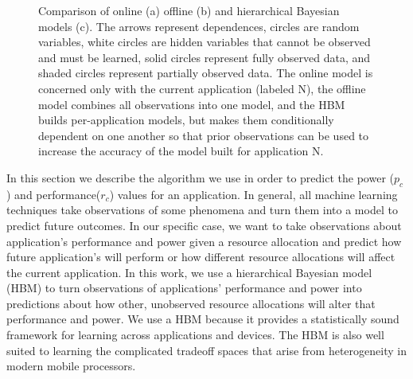 {\begin{figure}
  \caption{ Comparison of online (a) offline (b) and hierarchical
    Bayesian models (c).  The arrows represent dependences, circles
    are random variables, white circles are hidden variables that
    cannot be observed and must be learned, solid circles represent
    fully observed data, and shaded circles represent partially
    observed data.  The online model is concerned only with the
    current application (labeled N), the offline model combines all
    observations into one model, and the HBM builds per-application
    models, but makes them conditionally dependent on one another so
    that prior observations can be used to increase the accuracy of
    the model built for application N.}
\label{fig:learning-models}
\end{figure}
}
In this section we describe the algorithm we use in order to predict the power ($p_c$) and performance($r_c$) values for an application. In general, all machine learning techniques take observations of some
phenomena and turn them into a model to predict future outcomes.  In
our specific case, we want to take observations about application's
performance and power given a resource allocation and predict how
future application's will perform or how different resource
allocations will affect the current application. In this work, we use a hierarchical Bayesian model (HBM) to turn
observations of applications' performance and power into predictions
about how other, unobserved resource allocations will alter that
performance and power.  We use a HBM because it provides a
statistically sound framework for learning across applications and
devices.  The HBM is also well suited to learning the complicated
tradeoff spaces that arise from heterogeneity in modern mobile
processors.

